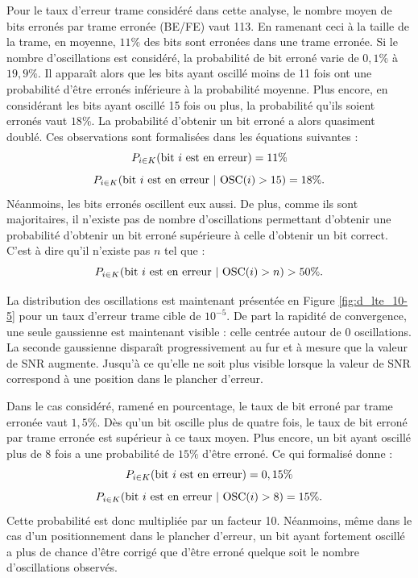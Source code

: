 Pour le taux d'erreur trame considéré dans cette analyse, le nombre moyen de bits erronés par trame erronée (BE/FE) vaut 
113. En ramenant ceci à la taille de la trame, en moyenne, $11\%$ des bits sont erronées dans une trame erronée. 
Si le nombre d'oscillations est considéré, la probabilité de bit erroné varie de $0,1\%$ à $19,9\%$. Il apparaît alors 
que les bits ayant oscillé moins de 11 fois ont une probabilité d'être erronés inférieure à la probabilité moyenne. Plus encore, 
en considérant les bits ayant oscillé 15 fois ou plus, la probabilité qu'ils soient erronés vaut $18\%$. La probabilité 
d'obtenir un bit erroné a alors quasiment doublé. 
Ces observations sont formalisées dans les équations suivantes :
\[P_{i \in K} (\textnormal{bit } i \textnormal{ est en erreur}) = 11 \%\]
\[P_{i \in K} (\textnormal{bit } i \textnormal{ est en erreur}\ |\ \textnormal{OSC}(i) > 15 ) = 18 \%.\]
Néanmoins, les bits erronés oscillent eux aussi. De plus, comme ils sont majoritaires, il n'existe pas de 
nombre d'oscillations permettant d'obtenir une probabilité d'obtenir un bit erroné supérieure à celle d'obtenir un bit
correct. C'est à dire qu'il n'existe pas $n$ tel que : 
\[P_{i \in K} (\textnormal{bit } i \textnormal{ est en erreur}\ |\ \textnormal{OSC}(i) > n ) > 50 \%.\]

La distribution des oscillations est maintenant présentée en Figure \ref{fig:d_lte_10-5} pour un  taux d'erreur trame 
cible de $10^{-5}$. De part la rapidité de convergence, une seule gaussienne est maintenant visible : celle centrée autour 
de 0 oscillations. 
La seconde gaussienne disparaît progressivement au fur et à mesure que la valeur de SNR augmente. Jusqu'à ce qu'elle ne 
soit plus visible lorsque la valeur de SNR correspond à une position dans le plancher d'erreur.

Dans le cas considéré, ramené en pourcentage, le taux de bit erroné par trame erronée vaut $1,5\%$. Dès qu'un bit oscille plus de quatre fois, 
le taux de bit erroné par trame erronée est supérieur à ce taux moyen. Plus encore, un bit ayant oscillé plus de 8 fois a une probabilité de $15\%$
d'être erroné. Ce qui formalisé donne :
\[P_{i \in K} (\textnormal{bit } i \textnormal{ est en erreur}) = 0,15 \%\]
\[P_{i \in K} (\textnormal{bit } i \textnormal{ est en erreur}\ |\ \textnormal{OSC}(i) > 8 ) = 15 \%.\]
Cette probabilité est donc multipliée par un facteur 10. Néanmoins, même dans le cas d'un positionnement 
dans le plancher d'erreur, un bit ayant fortement oscillé a plus de chance d'être corrigé que d'être erroné quelque soit le nombre
d'oscillations observés.

